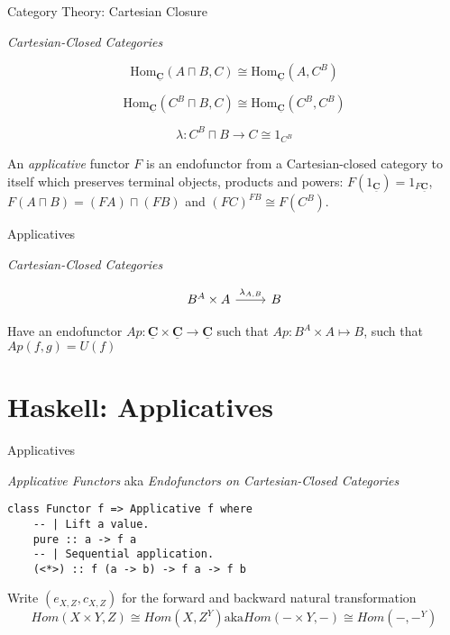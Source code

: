 \documentclass[10pt]{beamer}
\newcommand{\Cat}[1]{\ensuremath{\underline{\mathbf{#1}}}}
\newcommand{\Hom}[3]{\ensuremath{\mathrm{Hom}_{\Cat{#1}}(#2,#3)}}
\newcommand{\Com}[3]{#3^{#2}}
\theoremstyle{definition}
\theoremstyle{remark}
\numberwithin{equation}{section}
\begin{document}
\begin{frame}[fragile]{Category Theory: Cartesian Closure}

  \emph{Cartesian-Closed Categories}

  \[
  \Hom{C}{A\sqcap B}{C} \cong \Hom{C}{A}{\Com{C}{B}{C}}
  \]

  \[
  \Hom{C}{\Com{C}{B}{C}\sqcap B}{C} \cong \Hom{C}{\Com{C}{B}{C}}{\Com{C}{B}{C}}
  \]

  \[
  \lambda : \Com{C}{B}{C}\sqcap B \rightarrow C \cong 1_{\Com{C}{B}{C}}
  \]

  An \emph{applicative} functor $F$ is an endofunctor from a Cartesian-closed category to itself which preserves terminal objects, products and powers: $F(1_{\Cat{C}}) = 1_{F \Cat{C}}$, $F(A\sqcap B) = (F A)\sqcap(F B)$ and $\Com{C}{F B}{(F C)} \cong F( \Com{C}{B}{C} )$.

\end{frame}

\begin{frame}[fragile]{Applicatives}

  \emph{Cartesian-Closed Categories}

  \[
  \begin{tikzcd}
    B^A \times A \arrow{r}{\lambda_{A,B}} & B
  \end{tikzcd}
  \]

  Have an endofunctor $Ap : \Cat{C}\times\Cat{C} \rightarrow \Cat{C}$ such that $Ap : B^A \times A \mapsto B$, such that $ Ap(f,g) = U(f)$

\end{frame}

\section{Haskell: Applicatives}

\begin{frame}[fragile]{Applicatives}

  \emph{Applicative Functors}
  aka \emph{Endofunctors on Cartesian-Closed Categories}

  \begin{lstlisting}[frame=single]
class Functor f => Applicative f where
    -- | Lift a value.
    pure :: a -> f a
    -- | Sequential application.
    (<*>) :: f (a -> b) -> f a -> f b
  \end{lstlisting}

  Write $(e_{X,Z},c_{X,Z})$ for the forward and backward natural transformation
  \begin{equation}
    Hom(X\times Y,Z) \cong Hom(X,Z^Y) \mathrm{aka} Hom(- \times Y,-) \cong Hom(-,-^Y)
  \end{equation}
  
\end{frame}
\end{document}
